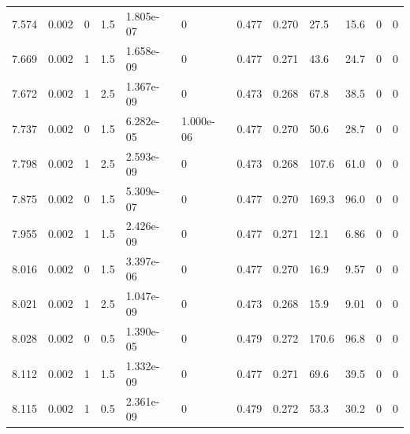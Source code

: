 \documentclass[preview]{standalone}
\begin{document}
{{{\begin{tabular}{L{1.2cm}C{1.2cm} C{0.3cm}C{0.5cm} C{1.4cm}C{1.4cm} C{1.4cm}C{1.4cm} C{1.6cm}C{1.6cm} C{1.6cm}C{1.6cm}}
  7.574  &  0.002  & 0     & 1.5 &  1.805e-07  & 0  &  0.477&   0.270& 27.5 & 15.6   &  0 & 0  \\ 
  7.669  &  0.002  & 1     & 1.5 &  1.658e-09  & 0  &  0.477&   0.271& 43.6 & 24.7   &  0 & 0  \\ 
  7.672  &  0.002  & 1     & 2.5 &  1.367e-09  & 0  &  0.473&   0.268& 67.8 & 38.5   &  0 & 0  \\ 
  7.737  &  0.002  & 0     & 1.5 &  6.282e-05  & 1.000e-06  &  0.477&   0.270& 50.6 & 28.7   &  0 & 0  \\ 
  7.798  &  0.002  & 1     & 2.5 &  2.593e-09  & 0  &  0.473&   0.268& 107.6 & 61.0   &  0 & 0  \\ 
  7.875  &  0.002  & 0     & 1.5 &  5.309e-07  & 0  &  0.477&   0.270& 169.3 & 96.0   &  0 & 0  \\ 
  7.955  &  0.002  & 1     & 1.5 &  2.426e-09  & 0  &  0.477&   0.271& 12.1 & 6.86   &  0 & 0  \\ 
  8.016  &  0.002  & 0     & 1.5 &  3.397e-06  & 0  &  0.477&   0.270& 16.9 & 9.57   &  0 & 0  \\ 
  8.021  &  0.002  & 1     & 2.5 &  1.047e-09  & 0  &  0.473&   0.268& 15.9 & 9.01   &  0 & 0  \\ 
  8.028  &  0.002  & 0     & 0.5 &  1.390e-05  & 0  &  0.479&   0.272& 170.6 & 96.8   &  0 & 0  \\ 
  8.112  &  0.002  & 1     & 1.5 &  1.332e-09  & 0  &  0.477&   0.271& 69.6 & 39.5   &  0 & 0  \\ 
  8.115  &  0.002  & 1     & 0.5 &  2.361e-09  & 0  &  0.479&   0.272& 53.3 & 30.2   &  0 & 0  \\ 
\hline 
\end{tabular} 

}}}
\end{document}
